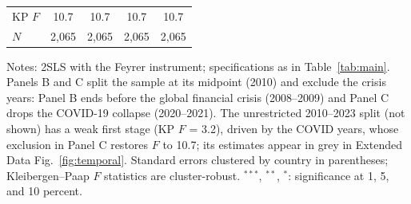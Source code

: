 \documentclass[12pt]{extarticle}
\begin{document}
\begin{table}[H]
{\begin{threeparttable}
\begin{tabular}{lcccc}
  KP $F$ & 10.7 & 10.7 & 10.7 & 10.7 \\
  $N$ & 2,065 & 2,065 & 2,065 & 2,065 \\
\bottomrule
\end{tabular}
\begin{tablenotes}[flushleft]
\footnotesize
\item Notes: 2SLS with the Feyrer instrument; specifications as in Table~\ref{tab:main}. Panels B and C split the sample at its midpoint (2010) and exclude the crisis years: Panel B ends before the global financial crisis (2008--2009) and Panel C drops the COVID-19 collapse (2020--2021). The unrestricted 2010--2023 split (not shown) has a weak first stage (KP $F$ = 3.2), driven by the COVID years, whose exclusion in Panel C restores $F$ to 10.7; its estimates appear in grey in Extended Data Fig.~\ref{fig:temporal}. Standard errors clustered by country in parentheses; Kleibergen--Paap $F$ statistics are cluster-robust. $^{***}$, $^{**}$, $^{*}$: significance at 1, 5, and 10 percent.
\end{tablenotes}
\end{threeparttable}}
\end{table}
\end{document}
